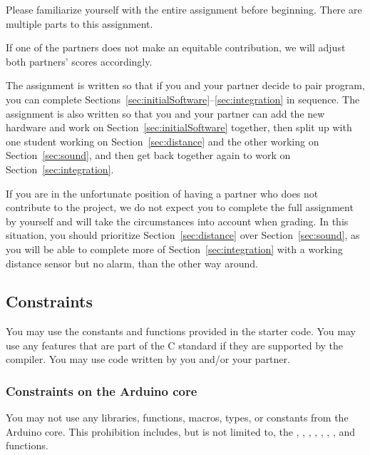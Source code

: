 Please familiarize yourself with the entire assignment before beginning.
There are multiple parts to this assignment.

If one of the partners does not make an equitable contribution, we will adjust both partners' scores accordingly.

The assignment is written so that if you and your partner decide to pair program, you can complete Sections~\ref{sec:initialSoftware}--\ref{sec:integration} in sequence.
The assignment is also written so that you and your partner can add the new hardware and work on Section~\ref{sec:initialSoftware} together, then split up with one student working on Section~\ref{sec:distance} and the other working on Section~\ref{sec:sound}, and then get back together again to work on Section~\ref{sec:integration}.

If you are in the unfortunate position of having a partner who does not contribute to the project, we do not expect you to complete the full assignment by yourself and will take the circumstances into account when grading.
In this situation, you should prioritize Section~\ref{sec:distance} over Section~\ref{sec:sound}, as you will be able to complete more of Section~\ref{sec:integration} with a working distance sensor but no alarm, than the other way around.

\subsection{Constraints} \label{subsec:constraints}

You may use the constants and functions provided in the starter code.
You may use any features that are part of the C standard if they are supported by the compiler.
You may use code written by you and/or your partner.

\subsubsection{Constraints on the Arduino core}


You may not use any %
libraries, functions, macros, types, or constants from the Arduino core.
This prohibition includes, but is not limited to, the , , , , , , , and  functions.

